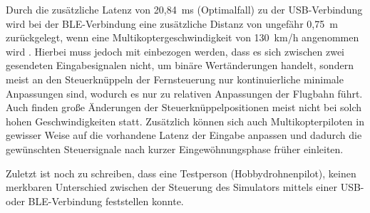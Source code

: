
Durch die zusätzliche Latenz von 20,84~ms (Optimalfall) zu der USB-Verbindung wird bei der \ac{BLE}-Verbindung eine zusätzliche Distanz von ungefähr 0,75~m zurückgelegt, wenn eine Multikoptergeschwindigkeit von 130~km/h angenommen wird \cites{droneSpeed1}{droneSpeed2}{droneSpeed3}. Hierbei muss jedoch mit einbezogen werden, dass es sich zwischen zwei gesendeten Eingabesignalen nicht, um binäre Wertänderungen handelt, sondern meist an den Steuerknüppeln der Fernsteuerung nur kontinuierliche minimale Anpassungen sind, wodurch es nur zu relativen Anpassungen der Flugbahn führt. Auch finden große Änderungen der Steuerknüppelpositionen meist nicht bei solch hohen Geschwindigkeiten statt. Zusätzlich können sich auch Multikopterpiloten in gewisser Weise auf die vorhandene Latenz der Eingabe anpassen und dadurch die gewünschten Steuersignale nach kurzer Eingewöhnungsphase früher einleiten.

Zuletzt ist noch zu schreiben, dass eine Testperson (Hobbydrohnenpilot), keinen merkbaren Unterschied zwischen der Steuerung des Simulators mittels einer USB- oder \ac{BLE}-Verbindung feststellen konnte.

